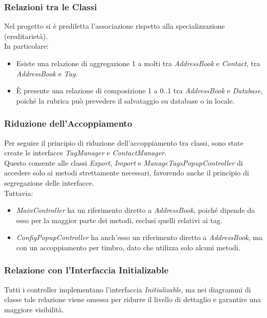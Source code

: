\subsubsection{Relazioni tra le Classi}
Nel progetto si è prediletta l’associazione rispetto alla specializzazione (ereditarietà). \\
In particolare:
\begin{itemize}[noitemsep, topsep=5pt]
	\item Esiste una relazione di aggregazione 1 a molti tra \textit{AddressBook} e \textit{Contact}, tra \textit{AddressBook} e \textit{Tag}.
	\item È presente una relazione di composizione 1 a 0..1 tra \textit{AddressBook} e \textit{Database}, poiché la rubrica può prevedere il salvataggio su database o in locale.
\end{itemize}

\subsubsection{Riduzione dell’Accoppiamento}
Per seguire il principio di riduzione dell’accoppiamento tra classi, sono state create le interfacce \textit{TagManager} e \textit{ContactManager}. \\
Questo consente alle classi \textit{Export}, \textit{Import} e \textit{ManageTagsPopupController} di accedere solo ai metodi strettamente necessari, favorendo anche il principio di segregazione delle interfacce.\\
Tuttavia:
\begin{itemize}[noitemsep, topsep=5pt]
	\item \textit{MainController} ha un riferimento diretto a \textit{AddressBook}, poiché dipende da esso per la maggior parte dei metodi, esclusi quelli relativi ai tag.
	\item \textit{ConfigPopupController} ha anch’esso un riferimento diretto a \textit{AddressBook}, ma con un accoppiamento per timbro, dato che utilizza solo alcuni metodi.
\end{itemize}
\subsubsection{Relazione con l’Interfaccia Initializable}
Tutti i controller implementano l’interfaccia \textit{Initializable}, ma nei diagrammi di classe tale relazione viene omessa per ridurre il livello di dettaglio e garantire una maggiore visibilità.

